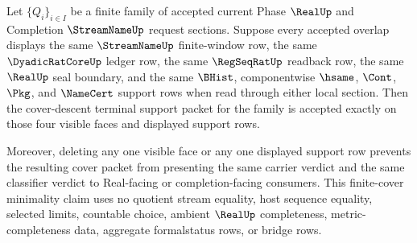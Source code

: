 \begin{theorem}
\label{thm:streamname-finite-cover-terminal-support-minimality}
Let $\{Q_i\}_{i \in I}$ be a finite family of accepted current Phase $\RealUp$
and Completion $\StreamNameUp$ request sections. Suppose every accepted overlap
displays the same $\StreamNameUp$ finite-window row, the same
$\DyadicRatCoreUp$ ledger row, the same $\RegSeqRatUp$ readback row, the same
$\RealUp$ seal boundary, and the same $\BHist$, componentwise $\hsame$,
$\Cont$, $\Pkg$, and $\NameCert$ support rows when read through either local
section. Then the cover-descent terminal support packet for the family is
accepted exactly on those four visible faces and displayed support rows.

Moreover, deleting any one visible face or any one displayed support row
prevents the resulting cover packet from presenting the same carrier verdict
and the same classifier verdict to Real-facing or completion-facing consumers.
This finite-cover minimality claim uses no quotient stream equality, host
sequence equality, selected limits, countable choice, ambient $\RealUp$
completeness, metric-completeness data, aggregate formalstatus rows, or bridge
rows.
\end{theorem}
